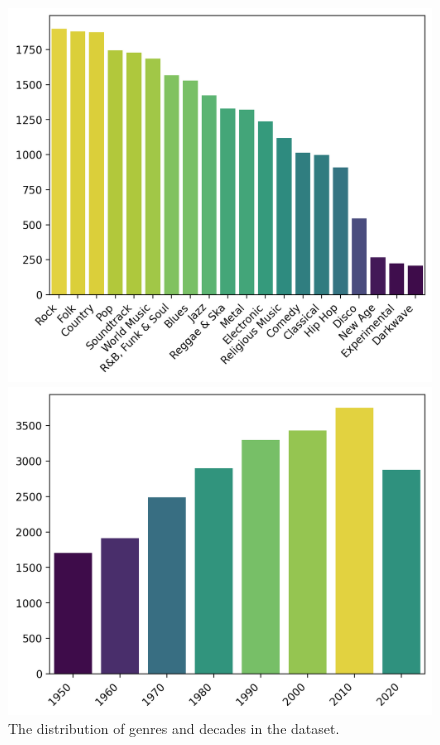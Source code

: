 \documentclass{article}
\begin{document}
\begin{figure}[!htbp]
    \centering
    \begin{minipage}{.49\textwidth}
        \centering
        \includegraphics[width=\linewidth]{images/genre-distribution.png}
    \end{minipage}\hfill
    \begin{minipage}{.49\textwidth}
        \centering
        \includegraphics[width=\linewidth]{images/decade-distribution.png}
        \vspace{0.475cm}
    \end{minipage}
    \caption{The distribution of genres and decades in the dataset.}
    \label{fig:genre-decade-distribution}
\end{figure}
\end{document}
